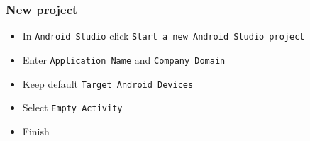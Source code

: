 %
%

\begin{frame}
  \frametitle{New project}
  
  
  \begin{itemize}
  \item<1-> In \texttt{Android Studio} click \texttt{Start a new Android
      Studio project}

  \item<2-> Enter \texttt{Application Name} and \texttt{Company
      Domain}
    
  \item<3-> Keep default \texttt{Target Android Devices}

  \item<4-> Select \texttt{Empty Activity}

  \item<5-> Finish

  \end{itemize}


\end{frame}



